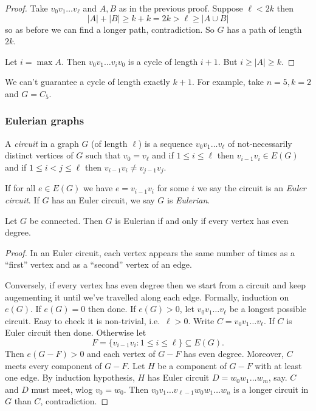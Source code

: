\documentclass[a4paper]{article}
\begin{document}
\begin{proof}
  Take \(v_0v_1 \dots v_\ell\) and \(A, B\) as in the previous proof. Suppose \(\ell < 2k\) then
  \[
    |A| + |B| \geq k + k = 2k > \ell \geq |A \cup B|
  \]
  so as before we can find a longer path, contradiction. So \(G\) has a path of length \(2k\).

  Let \(i = \max A\). Then \(v_0v_1 \dots v_iv_0\) is a cycle of length \(i + 1\). But \(i \geq |A| \geq k\).
\end{proof}

\begin{remark}
  We can't guarantee a cycle of length exactly \(k + 1\). For example, take \(n = 5, k = 2\) and \(G = C_5\).
\end{remark}

\subsubsection{Eulerian graphs}

\begin{definition}
  A \emph{circuit} in a graph \(G\) (of length \(\ell\)) is a sequence \(v_0v_1 \dots v_\ell\) of not-necessarily distinct vertices of \(G\) such that \(v_0 = v_\ell\) and if \(1 \leq i \leq \ell\) then \(v_{i - 1}v_i \in E(G)\) and if \(1 \leq i < j \leq \ell\) then \(v_{i - 1} v_i \neq v_{j - 1} v_j\).

  If for all \(e \in E(G)\) we have \(e = v_{i - 1}v_i\) for some \(i\) we say the circuit is an \emph{Euler circuit}. If \(G\) has an Euler circuit, we say \(G\) is \emph{Eulerian}.
\end{definition}

\begin{proposition}
  Let \(G\) be connected. Then \(G\) is Eulerian if and only if every vertex has even degree.
\end{proposition}

\begin{proof}
  In an Euler circuit, each vertex appears the same number of times as a ``first'' vertex and as a ``second'' vertex of an edge.

  Conversely, if every vertex has even degree then we start from a circuit and keep augementing it until we've travelled along each edge. Formally, induction on \(e(G)\). If \(e(G) = 0\) then done. If \(e(G) > 0\), let \(v_0v_1\dots v_\ell\) be a longest possible circuit. Easy to check it is non-trivial, i.e.\ \(\ell > 0\). Write \(C = v_0 v_1 \dots v_\ell\). If \(C\) is Euler circuit then done. Otherwise let
  \[
    F = \{v_{i - 1}v_i: 1 \leq i \leq \ell\} \subseteq E(G).
  \]
  Then \(e(G - F) > 0\) and each vertex of \(G - F\) has even degree. Moreover, \(C\) meets every component of \(G - F\). Let \(H\) be a component of \(G - F\) with at least one edge. By induction hypothesis, \(H\) has Euler circuit \(D = w_0w_1 \dots w_m\), say. \(C\) and \(D\) must meet, wlog \(v_0 = w_0\). Then \(v_0v_1 \dots v_{\ell - 1} w_0w_1 \dots w_n\) is a longer circuit in \(G\) than \(C\), contradiction.
\end{proof}
\end{document}
